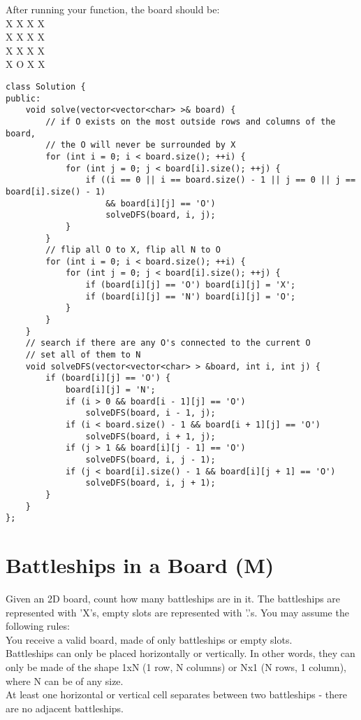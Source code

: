 After running your function, the board should be:\\
X X X X\\
X X X X\\
X X X X\\
X O X X\\

\begin{lstlisting}
class Solution {
public:
    void solve(vector<vector<char> >& board) {
        // if O exists on the most outside rows and columns of the board,
        // the O will never be surrounded by X
        for (int i = 0; i < board.size(); ++i) {
            for (int j = 0; j < board[i].size(); ++j) {
                if ((i == 0 || i == board.size() - 1 || j == 0 || j == board[i].size() - 1) 
                    && board[i][j] == 'O')
                    solveDFS(board, i, j);
            }
        }
        // flip all O to X, flip all N to O
        for (int i = 0; i < board.size(); ++i) {
            for (int j = 0; j < board[i].size(); ++j) {
                if (board[i][j] == 'O') board[i][j] = 'X';
                if (board[i][j] == 'N') board[i][j] = 'O';
            }
        }
    }
    // search if there are any O's connected to the current O
    // set all of them to N
    void solveDFS(vector<vector<char> > &board, int i, int j) {
        if (board[i][j] == 'O') {
            board[i][j] = 'N';
            if (i > 0 && board[i - 1][j] == 'O') 
                solveDFS(board, i - 1, j);
            if (i < board.size() - 1 && board[i + 1][j] == 'O') 
                solveDFS(board, i + 1, j);
            if (j > 1 && board[i][j - 1] == 'O') 
                solveDFS(board, i, j - 1);
            if (j < board[i].size() - 1 && board[i][j + 1] == 'O') 
                solveDFS(board, i, j + 1);
        }
    }
};
\end{lstlisting}

\section{Battleships in a Board (M)}
Given an 2D board, count how many battleships are in it. The battleships are represented with 'X's, empty slots are represented with '.'s. You may assume the following rules:\\

    You receive a valid board, made of only battleships or empty slots.\\
    Battleships can only be placed horizontally or vertically. In other words, they can only be made of the shape 1xN (1 row, N columns) or Nx1 (N rows, 1 column), where N can be of any size.\\
    At least one horizontal or vertical cell separates between two battleships - there are no adjacent battleships.\\
    

